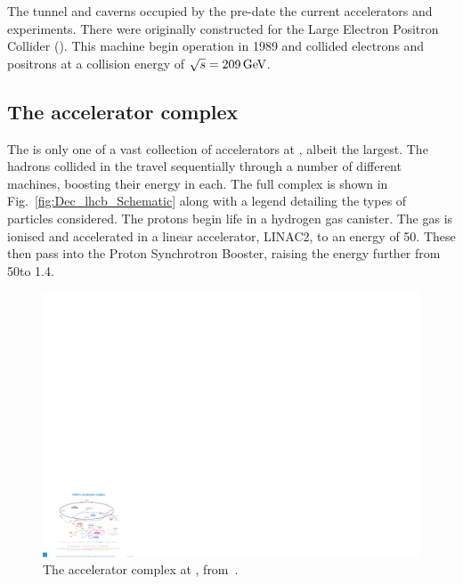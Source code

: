 The tunnel and caverns occupied by the \lhc pre-date the current accelerators and experiments. There were originally constructed for the Large Electron Positron Collider (\lep). This machine begin operation in 1989 and collided electrons and positrons at a collision energy of $\sqrt{s}=209\mathrm{\,Ge\kern -0.1em V}$.  


\subsection{The accelerator complex}

The \lhc is only one of a vast collection of accelerators at \cern, albeit the largest. The hadrons collided in the \lhc travel sequentially through a number of different machines, boosting their energy in each. The full complex is shown in Fig.~\ref{fig:Dec_lhcb_Schematic} along with a legend detailing the types of particles considered. The protons begin life in a hydrogen gas canister. The gas is ionised and accelerated in  a linear accelerator, LINAC2, to an energy of 50\mev. These then pass into the Proton Synchrotron Booster, raising the energy further from 50\mev to 1.4\gev. 

\begin{figure}[!h]
    \centering
    \includegraphics[width=1.0\textwidth]{figs/Detector/Acc_complex.pdf}
    \caption{The accelerator complex at \cern, from~\cite{DeMelis:2119882}.}
    \label{fig:Dec_Acc_Complex}   
\end{figure}

